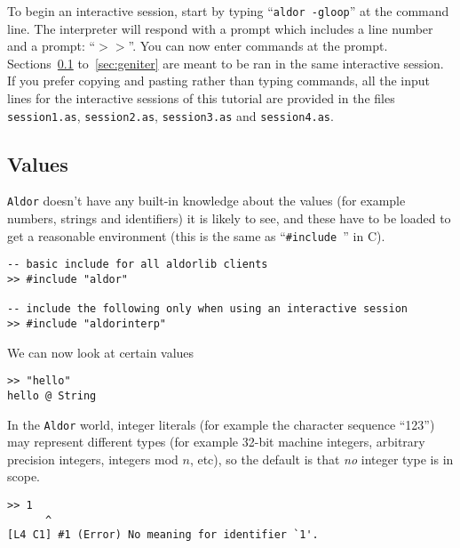 \documentclass{article}
\newcommand{\Aldor}{{\tt Aldor}}
\newcommand{\alprompt}{{\tt $>>$}}
\begin{document}
To begin an interactive session, start by typing
``{\tt aldor -gloop}''
at the command line.  The interpreter will respond with a
prompt which includes a line number and a prompt: ``\alprompt''.  You
can now enter commands at the prompt. Sections~\ref{sec:values}
to~\ref{sec:geniter} are meant to be ran in the same interactive session.
If you prefer copying and pasting rather than typing commands, all the
input lines for the interactive sessions of this tutorial are provided
in the files {\tt session1.as}, {\tt session2.as}, {\tt session3.as} and
{\tt session4.as}.


\subsection{Values}
\label{sec:values}

\Aldor{} doesn't have any built-in knowledge about the values (for
example numbers, strings and identifiers) it is likely to see, and
these have to be loaded to get a reasonable environment (this is the
same as ``\verb!#include !'' in C).

\begin{small}
\begin{verbatim}
-- basic include for all aldorlib clients
>> #include "aldor"

-- include the following only when using an interactive session
>> #include "aldorinterp"
\end{verbatim}
\end{small}

We can now look at certain values
\begin{small}
\begin{verbatim}
>> "hello"
hello @ String
\end{verbatim}
\end{small}

In the \Aldor{} world, integer literals (for example the character
sequence ``123'') may represent different types (for example 32-bit
machine integers, arbitrary precision integers, integers mod $n$,
etc), so the default is that {\em no} integer type is in scope.
\begin{small}
\begin{verbatim}
>> 1
      ^
[L4 C1] #1 (Error) No meaning for identifier `1'.
\end{verbatim}
\end{small}
\end{document}
